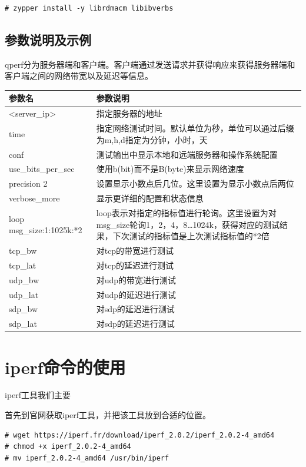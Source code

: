 \begin{verbatim}
# zypper install -y librdmacm libibverbs
\end{verbatim}

\subsection{参数说明及示例}

qperf分为服务器端和客户端。客户端通过发送请求并获得响应来获得服务器端和
客户端之间的网络带宽以及延迟等信息。

\begin{tabular}{lp{20em}}
  \toprule
  参数名       & 参数说明 \\
  \midrule
  <server\_ip>	& 指定服务器的地址 \\
  time            & 指定网络测试时间。默认单位为秒，单位可以通过后缀为m,h,d指定为分钟，小时，天 \\
  conf	        & 测试输出中显示本地和远端服务器和操作系统配置 \\
  use\_bits\_per\_sec & 使用b(bit)而不是B(byte)来显示网络速度 \\
  precision 2	& 设置显示小数点后几位。这里设置为显示小数点后两位 \\
  verbose\_more	& 显示更详细的配置和状态信息 \\
  loop msg\_size:1:1025k:*2 	& loop表示对指定的指标值进行轮询。这里设置为对msg\_size轮询1，2，4，8…1024k，获得对应的测试结果，下次测试的指标值是上次测试指标值的*2倍 \\
  tcp\_bw	& 对tcp的带宽进行测试 \\
  tcp\_lat	& 对tcp的延迟进行测试 \\
  udp\_bw	& 对udp的带宽进行测试 \\
  udp\_lat	& 对udp的延迟进行测试 \\
  sdp\_bw	& 对sdp的延迟进行测试 \\
  sdp\_lat	& 对sdp的延迟进行测试 \\
\bottomrule
\end{tabular}

\section{iperf命令的使用}
\label{sec:iperfCmd}

iperf工具我们主要

首先到官网获取iperf工具，并把该工具放到合适的位置。
\begin{verbatim}
# wget https://iperf.fr/download/iperf_2.0.2/iperf_2.0.2-4_amd64
# chmod +x iperf_2.0.2-4_amd64
# mv iperf_2.0.2-4_amd64 /usr/bin/iperf
\end{verbatim}

